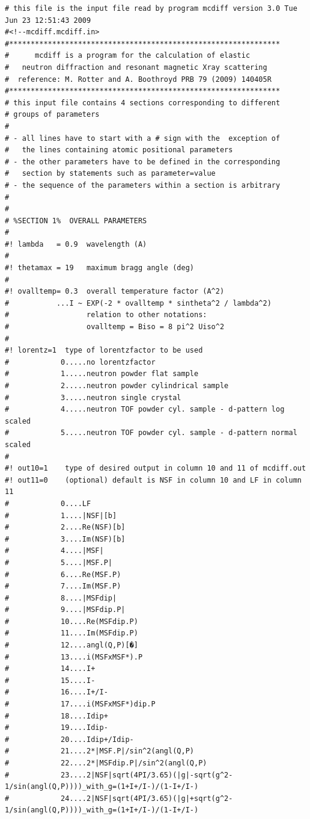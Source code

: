 {\footnotesize
\begin{verbatim}
# this file is the input file read by program mcdiff version 3.0 Tue Jun 23 12:51:43 2009
#<!--mcdiff.mcdiff.in>
#***************************************************************
#      mcdiff is a program for the calculation of elastic
#   neutron diffraction and resonant magnetic Xray scattering 
#  reference: M. Rotter and A. Boothroyd PRB 79 (2009) 140405R
#*************************************************************** 
# this input file contains 4 sections corresponding to different
# groups of parameters
#
# - all lines have to start with a # sign with the  exception of 
#   the lines containing atomic positional parameters
# - the other parameters have to be defined in the corresponding 
#   section by statements such as parameter=value
# - the sequence of the parameters within a section is arbitrary
# 
#
# %SECTION 1%  OVERALL PARAMETERS
#
#! lambda   = 0.9  wavelength (A)
#
#! thetamax = 19   maximum bragg angle (deg)
#
#! ovalltemp= 0.3  overall temperature factor (A^2) 
#           ...I ~ EXP(-2 * ovalltemp * sintheta^2 / lambda^2) 
#                  relation to other notations:
#                  ovalltemp = Biso = 8 pi^2 Uiso^2
#
#! lorentz=1  type of lorentzfactor to be used
#            0.....no lorentzfactor 
#            1.....neutron powder flat sample
#            2.....neutron powder cylindrical sample
#            3.....neutron single crystal
#            4.....neutron TOF powder cyl. sample - d-pattern log scaled
#            5.....neutron TOF powder cyl. sample - d-pattern normal scaled
#
#! out10=1    type of desired output in column 10 and 11 of mcdiff.out
#! out11=0    (optional) default is NSF in column 10 and LF in column 11
#            0....LF
#            1....|NSF|[b]
#            2....Re(NSF)[b]
#            3....Im(NSF)[b]
#            4....|MSF|
#            5....|MSF.P|
#            6....Re(MSF.P)
#            7....Im(MSF.P)
#            8....|MSFdip|
#            9....|MSFdip.P|
#            10....Re(MSFdip.P)
#            11....Im(MSFdip.P)
#            12....angl(Q,P)[�]
#            13....i(MSFxMSF*).P
#            14....I+
#            15....I-
#            16....I+/I-
#            17....i(MSFxMSF*)dip.P
#            18....Idip+
#            19....Idip-
#            20....Idip+/Idip-
#            21....2*|MSF.P|/sin^2(angl(Q,P)
#            22....2*|MSFdip.P|/sin^2(angl(Q,P)
#            23....2|NSF|sqrt(4PI/3.65)(|g|-sqrt(g^2-1/sin(angl(Q,P))))_with_g=(1+I+/I-)/(1-I+/I-)
#            24....2|NSF|sqrt(4PI/3.65)(|g|+sqrt(g^2-1/sin(angl(Q,P))))_with_g=(1+I+/I-)/(1-I+/I-)

\end{verbatim}}
